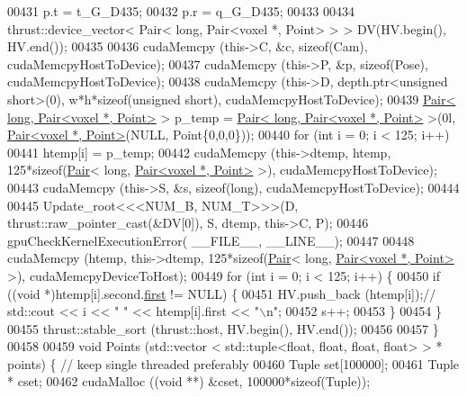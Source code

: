 \begin{DoxyCode}
{00431         p.t = t\_G\_D435;
00432         p.r = q\_G\_D435;
00433 
00434         thrust::device\_vector< Pair< long, Pair<voxel *, Point> > > DV(HV.begin(), HV.end());
00435 
00436         cudaMemcpy (this->C, &c, \textcolor{keyword}{sizeof}(Cam), cudaMemcpyHostToDevice);
00437         cudaMemcpy (this->P, &p, \textcolor{keyword}{sizeof}(Pose), cudaMemcpyHostToDevice);
00438         cudaMemcpy (this->D, depth.ptr<\textcolor{keywordtype}{unsigned} \textcolor{keywordtype}{short}>(0), w*h*\textcolor{keyword}{sizeof}(\textcolor{keywordtype}{unsigned} \textcolor{keywordtype}{short}), 
      cudaMemcpyHostToDevice);
00439         \hyperlink{classPair}{Pair< long, Pair<voxel *, Point>} > p\_temp = 
      \hyperlink{classPair}{Pair< long, Pair<voxel *, Point>} >(0l, 
      \hyperlink{classPair}{Pair<voxel *, Point>}(NULL, Point\{0,0,0\}));
00440         \textcolor{keywordflow}{for} (\textcolor{keywordtype}{int} i = 0; i < 125; i++)
00441             htemp[i] = p\_temp;
00442         cudaMemcpy (this->dtemp, htemp, 125*\textcolor{keyword}{sizeof}(\hyperlink{classPair}{Pair}< \textcolor{keywordtype}{long}, 
      \hyperlink{classPair}{Pair<voxel *, Point>} >), cudaMemcpyHostToDevice);
00443         cudaMemcpy (this->S, &s, \textcolor{keyword}{sizeof}(\textcolor{keywordtype}{long}), cudaMemcpyHostToDevice);
00444 
00445         Update\_root<<<NUM\_B, NUM\_T>>>(D, thrust::raw\_pointer\_cast(&DV[0]), S, dtemp, this->C, P);
00446         gpuCheckKernelExecutionError( \_\_FILE\_\_, \_\_LINE\_\_);
00447 
00448         cudaMemcpy (htemp, this->dtemp, 125*\textcolor{keyword}{sizeof}(\hyperlink{classPair}{Pair}< \textcolor{keywordtype}{long}, 
      \hyperlink{classPair}{Pair<voxel *, Point>} >), cudaMemcpyDeviceToHost);
00449         \textcolor{keywordflow}{for} (\textcolor{keywordtype}{int} i = 0; i < 125; i++) \{
00450             \textcolor{keywordflow}{if} ((\textcolor{keywordtype}{void} *)htemp[i].second.\hyperlink{classPair_a98924311a2986df358d3b1965f8abd06}{first} != NULL) \{
00451                 HV.push\_back (htemp[i]);\textcolor{comment}{// std::cout << i << " " << htemp[i].first << "\(\backslash\)n";}
00452                 s++;
00453             \}
00454         \}
00455         thrust::stable\_sort (thrust::host, HV.begin(), HV.end());
00456 
00457     \}
00458 
00459     \textcolor{keywordtype}{void} Points (std::vector < std::tuple<float, float, float, float> > * points) \{ \textcolor{comment}{// keep single threaded
       preferably}
00460         Tuple \textcolor{keyword}{set}[100000];
00461         Tuple * cset;
00462         cudaMalloc ((\textcolor{keywordtype}{void} **) &cset, 100000*\textcolor{keyword}{sizeof}(Tuple));
}
\end{DoxyCode}
